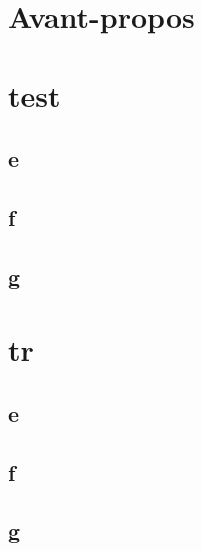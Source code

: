 \documentclass[a4paper,french,final]{memoir}
\begin{document}
\begin{titlingpage}
\hypersetup{pageanchor=false}

\end{titlingpage}
\frontmatter
\tableofcontents
\chapter{Avant-propos}
\mainmatter
\let\savedthechapter\thechapter%
\renewcommand{\thechapter}{premier}
\chapter{test}
\let\thechapter\savedthechapter%
\section{e}
\section{f}
\section{g}
\chapter{}
\appendixpage
\appendix

\chapter{tr}
\section{e}
\section{f}
\section{g}
\backmatter
\end{document}
